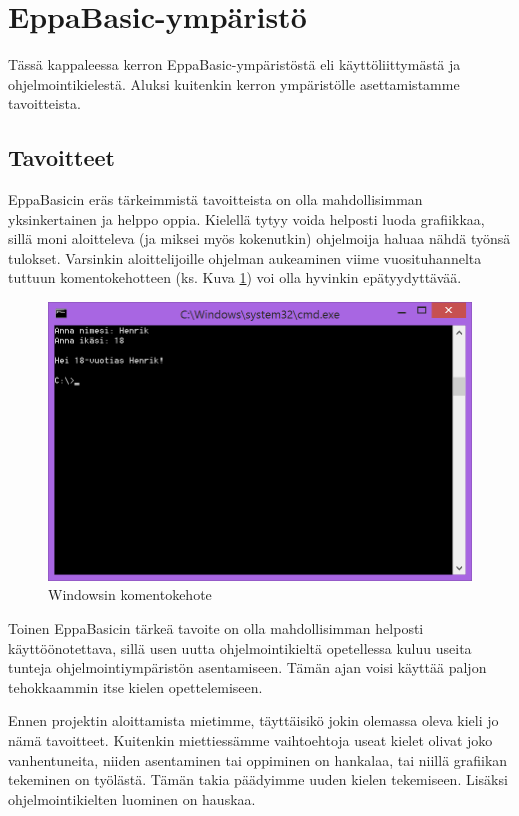 \section{EppaBasic-ympäristö}

Tässä kappaleessa kerron EppaBasic-ympäristöstä
eli käyttöliittymästä ja ohjelmointikielestä.
Aluksi kuitenkin kerron ympäristölle
asettamistamme tavoitteista.

\subsection{Tavoitteet}
EppaBasicin eräs tärkeimmistä tavoitteista on olla
mahdollisimman yksinkertainen ja helppo oppia.
Kielellä tytyy voida helposti luoda grafiikkaa,
sillä moni aloitteleva (ja miksei myös kokenutkin)
ohjelmoija haluaa nähdä työnsä tulokset.
Varsinkin aloittelijoille ohjelman aukeaminen
viime vuosituhannelta tuttuun komentokehotteen
(ks. Kuva \ref{img:cmd})
voi olla hyvinkin epätyydyttävää.

\begin{figure}[h]
    \centering
    \includegraphics[width=1\textwidth]{cmd}
    \caption{Windowsin komentokehote}
    \label{img:cmd}
\end{figure}

Toinen EppaBasicin tärkeä tavoite on olla
mahdollisimman helposti käyttöönotettava,
sillä usen uutta ohjelmointikieltä opetellessa
kuluu useita tunteja ohjelmointiympäristön asentamiseen.
Tämän ajan voisi käyttää paljon tehokkaammin
itse kielen opettelemiseen.

Ennen projektin aloittamista mietimme,
täyttäisikö jokin olemassa oleva kieli jo nämä tavoitteet.
Kuitenkin miettiessämme vaihtoehtoja
useat kielet olivat joko vanhentuneita,
niiden asentaminen tai oppiminen on hankalaa,
tai niillä grafiikan tekeminen on työlästä.
Tämän takia päädyimme uuden kielen tekemiseen.
Lisäksi ohjelmointikielten luominen on hauskaa.

